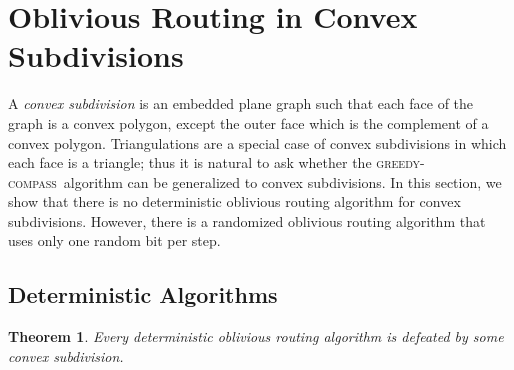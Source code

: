 \documentclass{article}
\newcommand{\seclabel}[1]{\label{sec:#1}}
\newtheorem{thm}{Theorem}{\bfseries}{\itshape}
\newcommand{\thmlabel}[1]{\label{thm:#1}}
\newcommand{\gc}{\textsc{greedy-compass}}
\begin{document}
\section{Oblivious Routing in Convex Subdivisions}\seclabel{convex}

A \emph{convex subdivision} is an embedded plane graph such that each
face of the graph is a convex polygon, except the outer face which is
the complement of a convex polygon.  Triangulations are a special case
of convex subdivisions in which each face is a triangle; thus it is
natural to ask whether the \gc\ algorithm can be generalized to convex
subdivisions.  In this section, we show that there is no deterministic
oblivious routing algorithm for convex subdivisions.  However, there
is a randomized oblivious routing algorithm that uses only one random
bit per step.

\subsection{Deterministic Algorithms}

\begin{thm}\thmlabel{no-convex}
Every deterministic oblivious routing algorithm is defeated by some
convex subdivision.
\end{thm}
\end{document}
